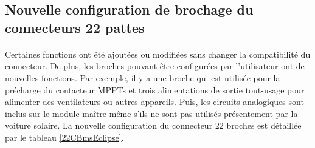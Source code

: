 	
	\subsection{Nouvelle configuration de brochage du connecteurs 22 pattes}	
		\paragraph*{}
		Certaines fonctions ont été ajoutées ou modifiées sans changer la compatibilité du connecteur. De plus, les broches pouvant être configurées par l'utilisateur ont de nouvelles fonctions. Par exemple, il y a une broche qui est utilisée pour la précharge du contacteur MPPTs et trois alimentations de sortie tout-usage pour alimenter des ventilateurs ou autres appareils. Puis, les circuits analogiques sont inclus sur le module maître même s'ils ne sont pas utilisés présentement par la voiture solaire. La nouvelle configuration du connecteur 22 broches est détaillée par le tableau \ref{22CBmsEclipse}.
		
